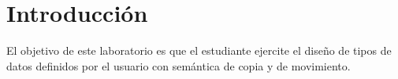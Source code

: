 \section{Introducción}

El objetivo de este laboratorio es que el estudiante ejercite el diseño de tipos
de datos definidos por el usuario con semántica de copia y de movimiento.


